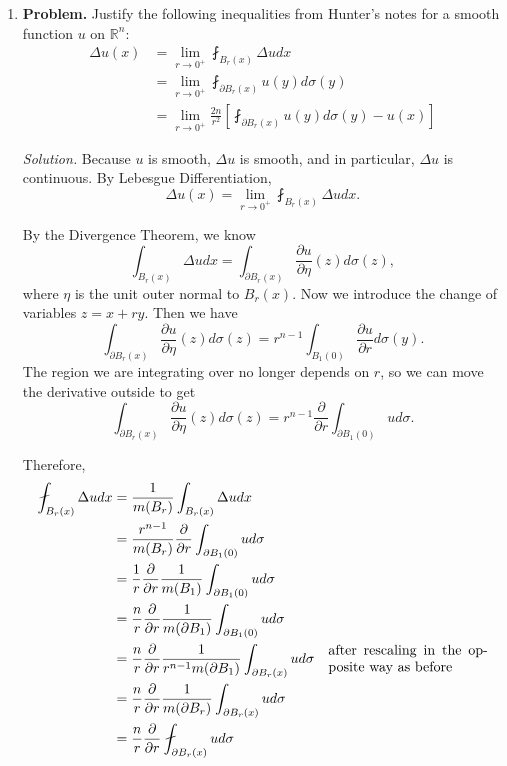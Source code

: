 \documentclass[a4paper]{article}
\newenvironment{solution}{\emph{Solution.}}{}
\newenvironment{problem}{\textbf{Problem.}}{}
\newcommand{\R}{\mathbb{R}}
\begin{document}
\begin{enumerate}
  \item
    \begin{problem}
      Justify the following inequalities from Hunter's notes for a smooth function $u$ on $\R^n$:
      \begin{align*}
        \Delta u(x) &= \lim_{r \to 0^+} \fint_{B_r(x)} \Delta u dx \\
        &= \lim_{r \to 0^+} \fint_{\partial B_r(x)}^{} u(y) d\sigma(y) \\
        &= \lim_{r \to 0^+} \frac{2n}{r^2} \left[ \fint_{\partial B_r(x)}^{} u(y) d\sigma(y) - u(x) \right]
      \end{align*}

    \end{problem}

    \begin{solution}
      Because $u$ is smooth, $\Delta u$ is smooth, and in particular, $\Delta u$ is continuous. By Lebesgue Differentiation,
      \[ \Delta u(x) = \lim_{r \to 0^+} \fint_{B_r(x)}^{} \Delta u dx .\]

      By the Divergence Theorem, we know
      \[ \int_{B_r(x)}^{} \Delta u dx = \int_{\partial B_r(x)}^{} \frac{\partial u}{\partial \eta}(z) d \sigma(z) ,\]
      where $\eta$ is the unit outer normal to $B_r(x)$. Now we introduce the change of variables $z = x+ry$. Then we have
      \[ \int_{\partial B_r(x)}^{} \frac{\partial u}{\partial \eta}(z) d \sigma(z) = r^{n-1} \int_{B_1(0)}^{} \frac{\partial u}{\partial r} d
      \sigma(y) .\]
      The region we are integrating over no longer depends on $r$, so we can move the derivative outside to get
      \[ \int_{\partial B_r(x)}^{} \frac{\partial u}{\partial \eta}(z) d \sigma(z) = r^{n-1} \frac{\partial}{\partial r} \int_{\partial B_1(0)}^{}
      u d \sigma .\]

      Therefore,
      \begin{align*}
        \fint_{B_r(x)}^{} \Delta u dx
        &=\frac{1}{m(B_r)} \int_{B_r(x)}^{} \Delta u dx \\
        &= \frac{r^{n-1}}{m(B_r)} \frac{\partial}{\partial r} \int_{\partial B_1(0)}^{} u d\sigma \\
        &= \frac{1}{r} \frac{\partial}{\partial r} \frac{1}{m(B_1)} \int_{\partial B_1(0)}^{} u d\sigma \\
        &= \frac{n}{r} \frac{\partial}{\partial r} \frac{1}{m(\partial B_1)} \int_{\partial B_1(0)}^{} u d\sigma \\
        &= \frac{n}{r} \frac{\partial}{\partial r} \frac{1}{r^{n-1} m(\partial B_1)} \int_{\partial B_r(x)}^{} u d\sigma \quad \parbox{4cm}{after
        rescaling in the opposite way as before} \\
        &= \frac{n}{r} \frac{\partial}{\partial r} \frac{1}{m(\partial B_r)} \int_{\partial B_r(x)}^{} u d\sigma \\
        &= \frac{n}{r} \frac{\partial}{\partial r} \fint_{\partial B_r(x)}^{} u d\sigma
      \end{align*}


\end{solution}
\end{enumerate}
\end{document}
